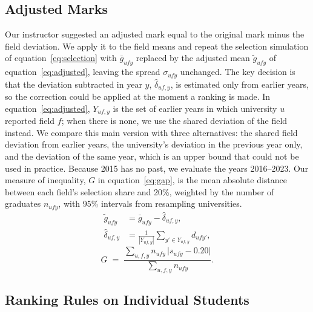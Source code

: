 \subsection{Adjusted Marks}
\label{sec:methods-adjusted}

Our instructor suggested an adjusted mark equal to the original mark minus the field deviation. We apply it to the field means and repeat the selection simulation of equation~\eqref{eq:selection} with $\bar g_{ufy}$ replaced by the adjusted mean $\tilde g_{ufy}$ of equation~\eqref{eq:adjusted}, leaving the spread $\sigma_{ufy}$ unchanged. The key decision is that the deviation subtracted in year $y$, $\hat\delta_{uf,y}$, is estimated only from earlier years, so the correction could be applied at the moment a ranking is made. In equation~\eqref{eq:adjusted}, $Y_{uf,y}$ is the set of earlier years in which university $u$ reported field $f$; when there is none, we use the shared deviation of the field instead. We compare this main version with three alternatives: the shared field deviation from earlier years, the university's deviation in the previous year only, and the deviation of the same year, which is an upper bound that could not be used in practice. Because 2015 has no past, we evaluate the years 2016--2023. Our measure of inequality, $G$ in equation~\eqref{eq:gap}, is the mean absolute distance between each field's selection share and 20\%, weighted by the number of graduates $n_{ufy}$, with 95\% intervals from resampling universities.
\begin{equation}
  \begin{aligned}
  \tilde g_{ufy} &= \bar g_{ufy} - \hat\delta_{uf,y},\\
  \hat\delta_{uf,y} &= \frac{1}{|Y_{uf,y}|}\sum_{y' \in Y_{uf,y}} d_{ufy'},
  \end{aligned}
  \label{eq:adjusted}
\end{equation}
\begin{equation}
  G \;=\; \frac{\sum_{u,f,y} n_{ufy}\,\lvert s_{ufy}-0.20\rvert}{\sum_{u,f,y} n_{ufy}} .
  \label{eq:gap}
\end{equation}

\subsection{Ranking Rules on Individual Students}
\label{sec:methods-rules}

